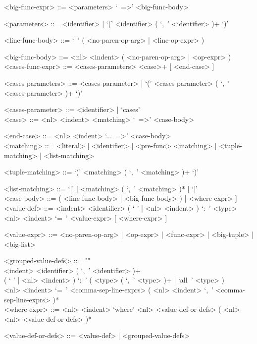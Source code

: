 \documentclass{article}
\begin{document}
\begin{grammar}
<big-func-expr> ::= <parameters> `\ =>' <big-func-body>

<parameters> ::= <identifier> | `(' <identifier> ( `,\ ' <identifier> )+ `)'

<line-func-body> ::= `\ ' ( <no-paren-op-arg> | <line-op-expr> )

<big-func-body> ::= <nl> <indent> ( <no-paren-op-arg> | <op-expr> )
\\

<cases-func-expr> ::= <cases-parameters> <case>+ [ <end-case> ]

<cases-parameters> ::=
<cases-parameter> | `(' <cases-parameter> ( `,\ ' <cases-parameter> )+ `)'

<cases-parameter> ::= <identifier> | `cases'
\\

<case> ::=  <nl> <indent> <matching> `\ =>' <case-body>

<end-case> ::= <nl> <indent> `...\ =>' <case-body>
\\

<matching> ::= 
<literal> | <identifier> | <pre-func> <matching> | <tuple-matching> |
<list-matching>

<tuple-matching> ::= `(' <matching> ( `,\ ' <matching> )+ `)'

<list-matching> ::= `[' [ <matching> ( `,\ ' <matching> )* ] `]'
\\

<case-body> ::= ( <line-func-body> | <big-func-body> ) [ <where-expr> ]
\\

<value-def> ::= 
<indent> <identifier> 
( ` ' | <nl> <indent> ) `:\ ' <type> 
<nl> <indent> `=\ ' <value-expr> [ <where-expr> ]

<value-expr> ::=
<no-paren-op-arg> | <op-expr> | <func-expr> | <big-tuple> | <big-list>

<grouped-value-defs> ::= ""\\
<indent> <identifier> ( `,\ ' <identifier> )+ \\
( ` ' | <nl> <indent> ) `:\ ' ( <type> ( `,\ ' <type> )+ | `all\ ' <type> ) \\
<nl> <indent> `=\ '
<comma-sep-line-exprs> ( <nl> <indent> `,\ ' <comma-sep-line-exprs> )*
\\

<where-expr> ::=
<nl> <indent> `where' <nl> <value-def-or-defs> ( <nl> <nl> <value-def-or-defs> )*

<value-def-or-defs> ::= <value-def> | <grouped-value-defs> 
\end{grammar}
\end{document}
